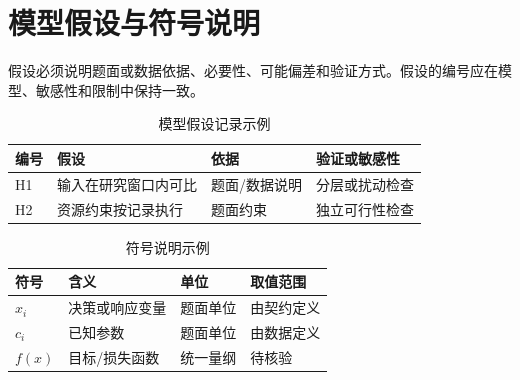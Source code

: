 \section{模型假设与符号说明}

假设必须说明题面或数据依据、必要性、可能偏差和验证方式。假设的编号应在模型、敏感性和限制中保持一致。

\begin{table}[H]
  \centering
  \caption{模型假设记录示例}
  \label{tab:assumptions}
  \begin{tabular}{p{}p{}p{}p{}}
    \toprule
    编号 & 假设 & 依据 & 验证或敏感性 \\
    \midrule
    H1 & 输入在研究窗口内可比 & 题面/数据说明 & 分层或扰动检查 \\
    H2 & 资源约束按记录执行 & 题面约束 & 独立可行性检查 \\
    \bottomrule
  \end{tabular}
\end{table}

\begin{table}[H]
  \centering
  \caption{符号说明示例}
  \label{tab:symbols}
  \begin{tabular}{@{}p{}p{}p{}p{}@{}}
    \toprule
    符号 & 含义 & 单位 & 取值范围 \\
    \midrule
    $x_i$ & 决策或响应变量 & 题面单位 & 由契约定义 \\
    $c_i$ & 已知参数 & 题面单位 & 由数据定义 \\
    $f(x)$ & 目标/损失函数 & 统一量纲 & 待核验 \\
    \bottomrule
  \end{tabular}
\end{table}
